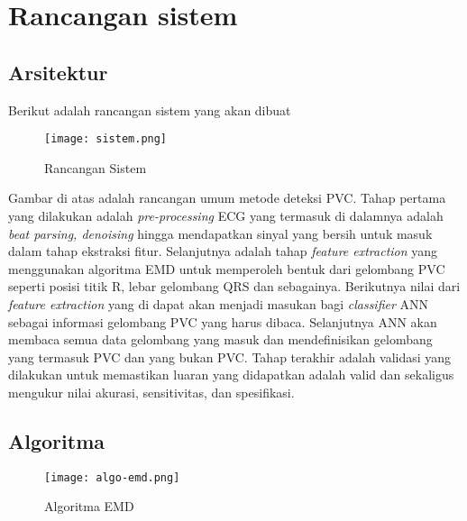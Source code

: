 \section{Rancangan sistem}
\subsection{Arsitektur}
Berikut adalah rancangan sistem yang akan dibuat

	\begin{figure}[h!]
		\centering
		\texttt{[image: sistem.png]}
		\caption{Rancangan Sistem}
		\label{fig:my_sistem}
	\end{figure}

Gambar di atas adalah rancangan umum metode deteksi PVC. Tahap pertama yang dilakukan adalah \textit{pre-processing} ECG yang termasuk di dalamnya adalah \textit{beat parsing, denoising} hingga mendapatkan sinyal yang bersih untuk masuk dalam tahap ekstraksi fitur. Selanjutnya adalah tahap \textit{feature extraction} yang menggunakan algoritma EMD untuk memperoleh bentuk dari gelombang PVC seperti posisi titik R, lebar gelombang QRS dan sebagainya. Berikutnya nilai dari \textit{feature extraction} yang di dapat akan menjadi masukan bagi \textit{classifier} ANN sebagai informasi gelombang PVC yang harus dibaca. Selanjutnya ANN akan membaca semua data gelombang yang masuk dan mendefinisikan gelombang yang termasuk PVC dan yang bukan PVC. Tahap terakhir adalah validasi yang dilakukan untuk memastikan luaran yang didapatkan adalah valid dan sekaligus mengukur nilai akurasi, sensitivitas, dan spesifikasi.
\subsection{Algoritma}	
\begin{figure}[h!]
	\centering
	\texttt{[image: algo-emd.png]}
	\caption{Algoritma EMD\cite{UMaji}}
	\label{fig:emd_algo}
\end{figure}